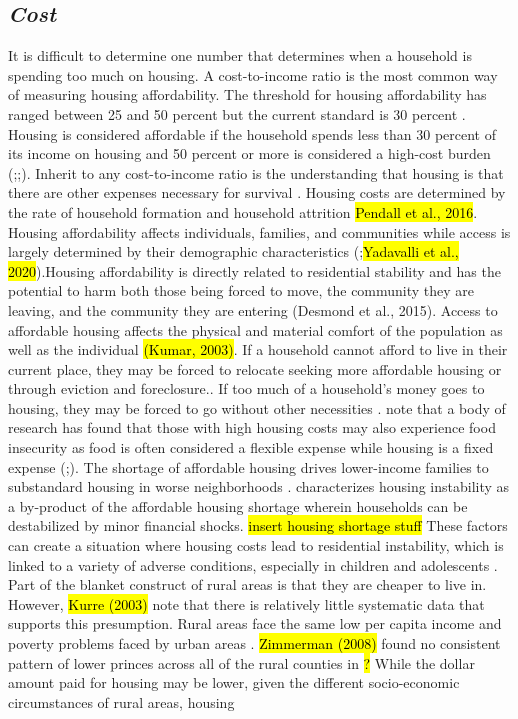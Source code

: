 \subsection{\textit{Cost}}
It is difficult to determine one number that determines when a household is spending too much on housing. A cost-to-income ratio is the most common way of measuring housing affordability. The threshold for housing affordability has ranged between 25 and 50 percent but the current standard is 30 percent \citep{kropczynski_insights_2012}.  Housing is considered affordable if the household spends less than 30 percent of its income on housing and 50 percent or more is considered a high-cost burden (\citealp{braveman_housing_2011};\citealp{swope_housing_2020};\citealp{weicher_housing_2006}). Inherit to any cost-to-income ratio is the understanding that housing is that there are other expenses necessary for survival \citep{herbert_measuring_2018}. Housing costs are determined by the rate of household formation and household attrition \hl{Pendall et al., 2016}.  Housing affordability affects individuals, families, and communities while access is largely determined by their demographic characteristics  (\citealp{braveman_housing_2011};\hl{Yadavalli et al., 2020}).Housing affordability is directly related to residential stability and has the potential to harm both those being forced to move, the community they are leaving, and the community they are entering (Desmond et al., 2015). Access to affordable housing affects the physical and material comfort of the population as well as the individual \hl{(Kumar, 2003)}. If a household cannot afford to live in their current place, they may be forced to relocate seeking more affordable housing or through eviction and foreclosure..  If too much of a household’s money goes to housing, they may be forced to go without other necessities \citep{herbert_measuring_2018}.   note that a body of research has found that those with high housing costs may also experience food insecurity as food is often considered a flexible expense while housing is a fixed expense (\citealp{fletcher_assessing_2009};\citealp{kropczynski_insights_2012}). The shortage of affordable housing drives lower-income families to substandard housing in worse neighborhoods \citep{braveman_housing_2011}. \citet{kang_severe_2021} characterizes housing instability as a by-product of the affordable housing shortage wherein households can be destabilized by minor financial shocks. \hl{insert housing shortage stuff} These  factors can create a situation where housing costs lead to residential instability, which is linked to a variety of adverse conditions, especially in children and adolescents \citep{desmond_forced_2015}. Part of the blanket construct of rural areas is that they are cheaper to live in. However, \hl{Kurre (2003)} note that there is relatively little systematic data that supports this presumption. Rural areas face the same low per capita income and poverty problems faced by urban areas \citep{castle_place_2011}. \hl{Zimmerman (2008)} found no consistent pattern of lower princes across all of the rural counties in \hl{?} While the dollar amount paid for housing may be lower, given the different socio-economic circumstances of rural areas, housing 